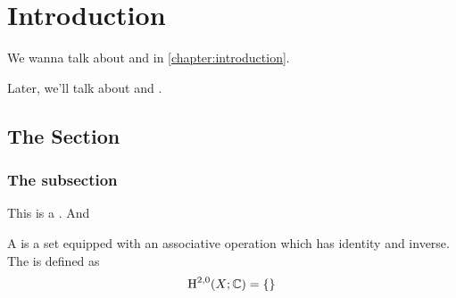 \chapter{Introduction}\label{chapter:introduction}

%
%
We wanna talk about \cite{milnor1963groups} and \cite{milnor1956manifolds} in \autoref{chapter:introduction}. 

Later, we'll talk about \cite{milnor2000exotic} and \cite{dieck2008algebraic}.

\section{The Section}

\lipsum[1]

\subsection{The subsection}

This is a . And

\lipsum[2]

\begin{definition}\label{def:first}
	A  is a set equipped with an associative operation which has identity and inverse. The  is defined as
	\[
		\operatorname{H}^{2,0}(X; \mathbb{C}) = \{\}
	\]
\end{definition}

